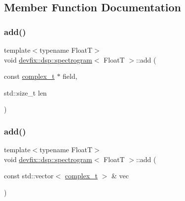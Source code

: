 \subsection{Member Function Documentation}
\mbox{\label{structdevfix_1_1dsp_1_1spectrogram_aa99ba03723f89062409935a8eddfe48e}} 
\subsubsection{\texorpdfstring{add()}{add()}\hspace{0.1cm}{\footnotesize\ttfamily [1/3]}}
{\footnotesize\ttfamily template$<$typename FloatT$>$ \\
void \hyperlink{structdevfix_1_1dsp_1_1spectrogram}{devfix\+::dsp\+::spectrogram}$<$ FloatT $>$\+::add (\begin{DoxyParamCaption}\item[{const \hyperlink{structdevfix_1_1dsp_1_1spectrogram_a222d1efa23713b334a001e625594b4d4}{complex\+\_\+t} $\ast$}]{field,  }\item[{std\+::size\+\_\+t}]{len }\end{DoxyParamCaption})\hspace{0.3cm}{\ttfamily [inline]}}

\mbox{\label{structdevfix_1_1dsp_1_1spectrogram_a2ad71f3d58619d29de6e655ddc1c2085}} 
\subsubsection{\texorpdfstring{add()}{add()}\hspace{0.1cm}{\footnotesize\ttfamily [2/3]}}
{\footnotesize\ttfamily template$<$typename FloatT$>$ \\
void \hyperlink{structdevfix_1_1dsp_1_1spectrogram}{devfix\+::dsp\+::spectrogram}$<$ FloatT $>$\+::add (\begin{DoxyParamCaption}\item[{const std\+::vector$<$ \hyperlink{structdevfix_1_1dsp_1_1spectrogram_a222d1efa23713b334a001e625594b4d4}{complex\+\_\+t} $>$ \&}]{vec }\end{DoxyParamCaption})\hspace{0.3cm}{\ttfamily [inline]}}

